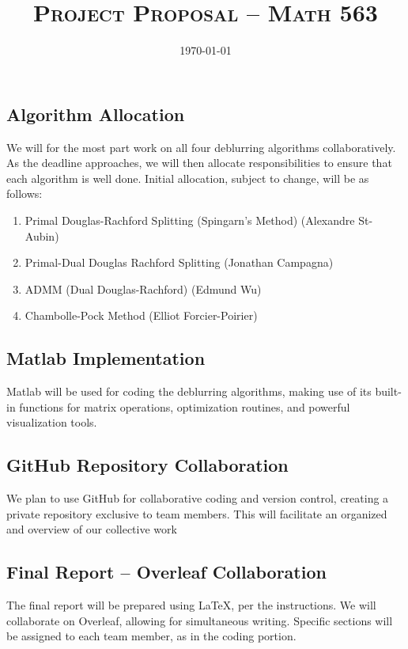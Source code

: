 \documentclass[12pt]{article}
\title{\textsc{Project Proposal -- Math 563}}
\author{\it \nameone \nametwo}
\date{\today}
\theoremstyle{definition}
\theoremstyle{remark}
\begin{document}
\maketitle 
\thispagestyle{empty} %

\subsection*{Algorithm Allocation}
We will for the most part work on all four deblurring algorithms collaboratively. As the deadline approaches, we will then allocate responsibilities to ensure that each algorithm is well done. Initial allocation, subject to change, will be as follows:

\begin{enumerate}
    \item Primal Douglas-Rachford Splitting (Spingarn’s Method) (Alexandre St-Aubin)
    \item Primal-Dual Douglas Rachford Splitting (Jonathan Campagna)
    \item ADMM (Dual Douglas-Rachford) (Edmund Wu)
    \item Chambolle-Pock Method (Elliot Forcier-Poirier)
\end{enumerate}

\subsection*{Matlab Implementation}
Matlab will be used for coding the deblurring algorithms, making use of its built-in functions for matrix operations, optimization routines, and powerful visualization tools.

\subsection*{GitHub Repository Collaboration}
We plan to use GitHub for collaborative coding and version control, creating a private repository exclusive to team members. This will facilitate an organized and overview of our collective work

\subsection*{Final Report -- Overleaf Collaboration}
The final report will be prepared using LaTeX, per the instructions. We will collaborate on Overleaf, allowing for simultaneous writing. Specific sections will be assigned to each team member, as in the coding portion.
\end{document}
